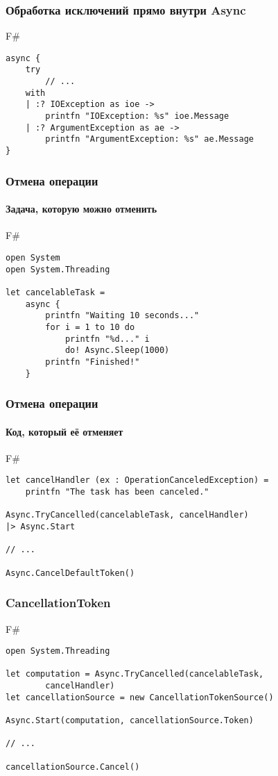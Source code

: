 \documentclass[xetex,mathserif,serif]{beamer}
\begin{document}
	\begin{frame}[fragile]
		\frametitle{Обработка исключений прямо внутри Async}
   		\begin{exampleblock}{F\#}
   			\begin{lstlisting}
async {
    try
        // ...
    with
    | :? IOException as ioe ->
        printfn "IOException: %s" ioe.Message
    | :? ArgumentException as ae ->
        printfn "ArgumentException: %s" ae.Message
}
\end{lstlisting}
\end{exampleblock}
\end{frame}

	\begin{frame}[fragile]
		\frametitle{Отмена операции}
		\framesubtitle{Задача, которую можно отменить}
   		\begin{exampleblock}{F\#}
   			\begin{lstlisting}
open System
open System.Threading

let cancelableTask =
    async {
        printfn "Waiting 10 seconds..."
        for i = 1 to 10 do
            printfn "%d..." i
            do! Async.Sleep(1000)
        printfn "Finished!"
    }
\end{lstlisting}
\end{exampleblock}
\end{frame}

	\begin{frame}[fragile]
		\frametitle{Отмена операции}
		\framesubtitle{Код, который её отменяет}
   		\begin{exampleblock}{F\#}
   			\begin{lstlisting}
let cancelHandler (ex : OperationCanceledException) =
    printfn "The task has been canceled."

Async.TryCancelled(cancelableTask, cancelHandler)
|> Async.Start

// ...

Async.CancelDefaultToken()
\end{lstlisting}
\end{exampleblock}
\end{frame}

	\begin{frame}[fragile]
		\frametitle{CancellationToken}
   		\begin{exampleblock}{F\#}
   			\begin{lstlisting}
open System.Threading

let computation = Async.TryCancelled(cancelableTask, 
        cancelHandler)
let cancellationSource = new CancellationTokenSource()

Async.Start(computation, cancellationSource.Token)

// ...

cancellationSource.Cancel()
\end{lstlisting}
\end{exampleblock}
\end{frame}
\end{document}
